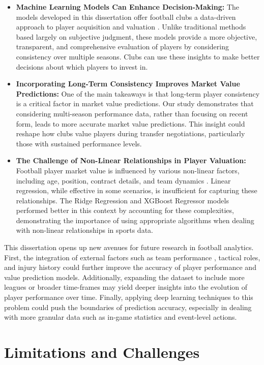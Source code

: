 \documentclass[12pt, a4paper,oneside]{book}
\numberwithin{equation}{section}
\begin{document}
\begin{itemize}
    \item \textbf{Machine Learning Models Can Enhance Decision-Making:} The models developed in this dissertation offer football clubs a data-driven approach to player acquisition and valuation \cite{Rein2016}. Unlike traditional methods based largely on subjective judgment, these models provide a more objective, transparent, and comprehensive evaluation of players by considering consistency over multiple seasons. Clubs can use these insights to make better decisions about which players to invest in.
    \item \textbf{Incorporating Long-Term Consistency Improves Market Value Predictions:} One of the main takeaways is that long-term player consistency is a critical factor in market value predictions. Our study demonstrates that considering multi-season performance data, rather than focusing on recent form, leads to more accurate market value predictions. This insight could reshape how clubs value players during transfer negotiations, particularly those with sustained performance levels.
    \item \textbf{The Challenge of Non-Linear Relationships in Player Valuation:} Football player market value is influenced by various non-linear factors, including age, position, contract details, and team dynamics \cite{Kaggle2021}. Linear regression, while effective in some scenarios, is insufficient for capturing these relationships. The Ridge Regression and XGBoost Regressor models performed better in this context by accounting for these complexities, demonstrating the importance of using appropriate algorithms when dealing with non-linear relationships in sports data.
\end{itemize}
This dissertation opens up new avenues for future research in football analytics. First, the integration of external factors such as team performance \cite{Gudmundssonh2017}, tactical roles, and injury history could further improve the accuracy of player performance and value prediction models. Additionally, expanding the dataset to include more leagues or broader time-frames may yield deeper insights into the evolution of player performance over time. Finally, applying deep learning techniques to this problem could push the boundaries of prediction accuracy, especially in dealing with more granular data such as in-game statistics and event-level actions.

\chapter{Limitations and Challenges}\label{ch:6}
\end{document}
